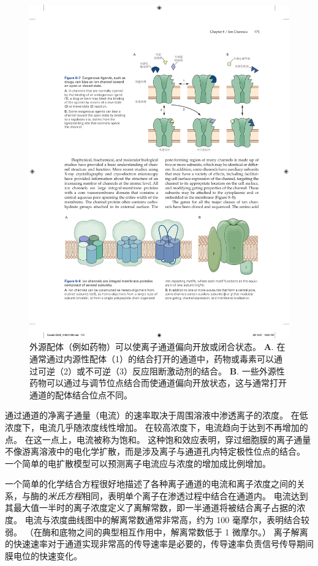 \begin{figure}[htbp]
	\centering
	\includegraphics[width=0.8\linewidth]{chap08/fig_8_7}
	\caption{外源配体（例如药物）可以使离子通道偏向开放或闭合状态。
		\textbf{A}. 在通常通过内源性配体（1）的结合打开的通道中，药物或毒素可以通过可逆（2）或不可逆（3）反应阻断激动剂的结合。
		\textbf{B}. 一些外源性药物可以通过与调节位点结合而使通道偏向开放状态，这与通常打开通道的配体结合位点不同。}
	\label{fig:8_7}
\end{figure}


通过通道的净离子通量（电流）的速率取决于周围溶液中渗透离子的浓度。
在低浓度下，电流几乎随浓度线性增加。
在较高浓度下，电流趋向于达到不再增加的点。
在这一点上，电流被称为饱和。
这种饱和效应表明，穿过细胞膜的离子通量不像游离溶液中的电化学扩散，而是涉及离子与通道孔内特定极性位点的结合。
一个简单的电扩散模型可以预测离子电流应与浓度的增加成比例增加。


一个简单的化学结合方程很好地描述了各种离子通道的电流和离子浓度之间的关系，与酶的\textit{米氏方程}相同，表明单个离子在渗透过程中结合在通道内。
电流达到其最大值一半时的离子浓度定义了离解常数，即一半通道将被结合离子占据的浓度。
电流与浓度曲线图中的解离常数通常非常高，约为 100 毫摩尔，表明结合较弱。
（在酶和底物之间的典型相互作用中，解离常数低于 1 微摩尔。）
离子解离的快速速率对于通道实现非常高的传导速率是必要的，传导速率负责信号传导期间膜电位的快速变化。


